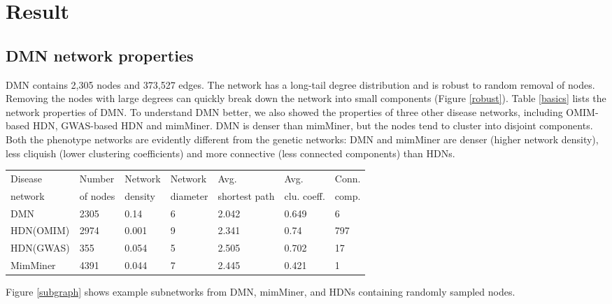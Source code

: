 \section{Result}
\subsection{DMN network properties}
DMN contains 2,305 nodes and 373,527 edges.
The network has a long-tail degree distribution and is robust to random removal of nodes.
Removing the nodes with large degrees can quickly break down the network into small components
(Figure \ref{robust}).
Table \ref{basics} lists the network properties of DMN. To understand DMN better,
we also showed the properties of three other disease networks,
including OMIM-based HDN, GWAS-based HDN and mimMiner.
DMN is denser than mimMiner, but the nodes tend to cluster into
disjoint components.
Both the phenotype networks are evidently different from the genetic networks:
DMN and mimMiner are denser (higher network density),
less cliquish (lower clustering coefficients)
and more connective (less connected components) than HDNs.
\begin{table*}[h!]
\caption{Global properties of DMN and the other disease networks, including HDNs (genetic disease networks) and mimMiner (widely-used phenotype network) based on OMIM text mining. The last three columns represent average shortest path, average cluster coefficient, and connected component, respectively. \label{basics}}
\vspace{0.3cm}
\begin{tabular}{lllllll}
\hline
Disease  & Number  & Network  & Network  & Avg.  & Avg.  & Conn. \\
network & of nodes & density & diameter & shortest path & clu. coeff. &comp. \\\hline
DMN      & 2305	&0.14	&6	&2.042	&0.649	&6\\\hline
HDN(OMIM)      & 2974	&0.001	&9	&2.341	&0.74	&797\\\hline
HDN(GWAS)      & 355  &0.054  &5  &2.505  &0.702  &17\\\hline
MimMiner & 4391	&0.044	&7	&2.445	&0.421	&1\\\hline
\end{tabular}
\end{table*}
Figure \ref{subgraph} shows example subnetworks from DMN, mimMiner, and HDNs containing randomly sampled nodes.
